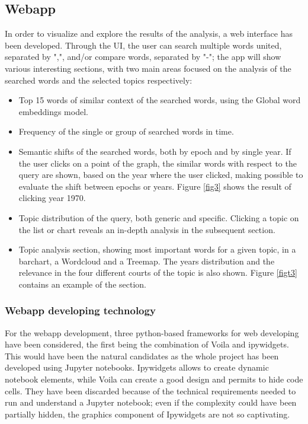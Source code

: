 \subsection{Webapp}
In order to visualize and explore the results of the analysis, a web interface has been developed. Through the UI, the
user can search multiple words united, separated by ",", and/or compare words, separated by "-"; the app will show
various interesting sections, with two main areas focused on the analysis of the searched words and the selected topics
respectively:
\begin{itemize}
  \item Top 15 words of similar context of the searched words, using the Global word embeddings model.
  \item Frequency of the single or group of searched words in time.
  \item Semantic shifts of the searched words, both by epoch and by single year.
    If the user clicks on a point of the graph, the similar words with respect to the query 
    are shown, based on the year where the user clicked, making possible to evaluate the  
    shift between epochs or years. Figure \vref{fig3} shows the result of clicking year 1970.
  \item Topic distribution of the query, both generic and specific. Clicking 
  a topic on the list or chart reveals an in-depth analysis in the subsequent section.
  \item Topic analysis section, showing most important words for a given topic, in a barchart, 
  a Wordcloud and a Treemap. The years distribution and the relevance in the four different courts of the topic is also shown. Figure \vref{figt3} contains an example of the section.
\end{itemize}

\subsubsection{Webapp developing technology}
For the webapp development, three python-based frameworks for web developing have been considered, the 
first being the combination of Voila and ipywidgets. This would have been the natural candidates as the whole project has 
been developed using Jupyter notebooks. Ipywidgets allows to create dynamic notebook elements, while 
Voila can create a good design and permits to hide code cells.
They have been discarded because of the technical requirements needed to run and understand a Jupyter
notebook; even if the complexity could have been partially hidden, the graphics component of Ipywidgets 
are not so captivating.

